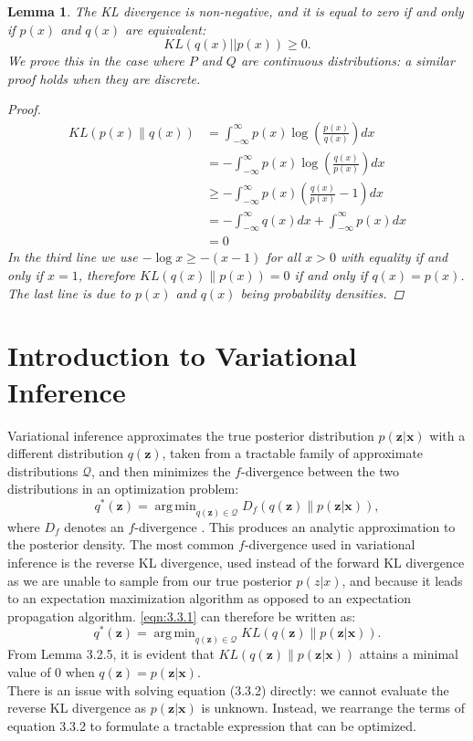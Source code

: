 \documentclass[honours,12pt]{unswthesis}
\DeclareMathOperator*{\argmin}{arg\,min}
\newtheorem{lemma}[theorem]{Lemma}
\numberwithin{equation}{section}
\theoremstyle{definition}
\begin{document}
\begin{lemma}\label{lemma:3.2.5}
The KL divergence is non-negative, and it is equal to zero if and only if $p(x)$ and $q(x)$ are equivalent:
\begin{equation*}
KL(q(x)||p(x))\geq 0.
\end{equation*}
We prove this in the case where $P$ and $Q$ are continuous distributions: a similar proof holds when they are discrete.
\begin{proof}
\begin{align*}
KL(p(x)\|q(x))&=\int_{-\infty}^\infty p(x)\log \left(\frac{p(x)}{q(x)}\right)dx\\
&=-\int_{-\infty}^\infty p(x)\log \left(\frac{q(x)}{p(x)}\right)dx\\
&\geq -\int_{-\infty}^\infty p(x) \left(\frac{q(x)}{p(x)}-1\right)dx\\
&=-\int_{-\infty}^\infty q(x)dx + \int_{-\infty}^\infty p(x)dx\\
&=0
\end{align*}
In the third line we use $-\log x \geq -(x-1)$ for all $x>0$ with equality if and only if $x=1$, therefore $KL(q(x)\|p(x))=0$ if and only if $q(x)=p(x)$. The last line is due to $p(x)$ and $q(x)$ being probability densities.
\end{proof}
\end{lemma}
\section{Introduction to Variational Inference}
Variational inference approximates the true posterior distribution $p(\bm{z}|\bm{x})$ with a different distribution $q(\bm{z})$, taken from a tractable family of approximate distributions $\mathcal{Q}$, and then minimizes the $f$-divergence between the two distributions in an optimization problem:
\begin{equation}\label{eqn:3.3.1}
q^*(\bm{z})=\argmin_{q(\bm{z})\in \mathcal{Q}}D_f(q(\bm{z})\|p(\bm{z}|\bm{x})),
\end{equation} where $D_f$ denotes an $f$-divergence \citep{blei}. This produces an analytic approximation to the posterior density. The most common $f$-divergence used in variational inference is the reverse KL divergence, used instead of the forward KL divergence as we are unable to sample from our true posterior $p(z|x)$, and because it leads to an expectation maximization algorithm as opposed to an expectation propagation algorithm. \autoref{eqn:3.3.1} can therefore be written as:
\begin{equation}\label{3.3.2}
q^*(\bm{z})=\argmin_{q(\bm{z})\in \mathcal{Q}}KL(q(\bm{z})\|p(\bm{z}|\bm{x})).
\end{equation}
From Lemma 3.2.5, it is evident that $KL(q(\bm{z})\|p(\bm{z}|\bm{x}))$ attains a minimal value of $0$ when $q(\bm{z})=p(\bm{z}|\bm{x})$.\\
There is an issue with solving equation (3.3.2) directly: we cannot evaluate the reverse KL divergence as $p(\bm{z}|\bm{x})$ is unknown. Instead, we rearrange the terms of equation 3.3.2 to formulate a tractable expression that can be optimized.
\end{document}
